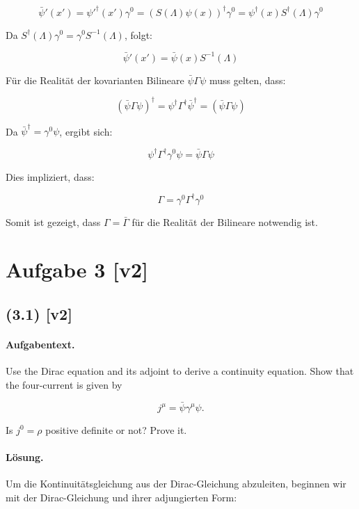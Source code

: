 \documentclass[11pt,a4paper]{article}
\begin{document}
\[
\bar{\psi}'(x') = \psi'^\dagger(x') \gamma^0 = \left(S(\Lambda) \psi(x)\right)^\dagger \gamma^0 = \psi^\dagger(x) S^\dagger(\Lambda) \gamma^0
\]

Da \(S^\dagger(\Lambda) \gamma^0 = \gamma^0 S^{-1}(\Lambda)\), folgt:

\[
\bar{\psi}'(x') = \bar{\psi}(x) S^{-1}(\Lambda)
\]

Für die Realität der kovarianten Bilineare \(\bar{\psi} \Gamma \psi\) muss gelten, dass:

\[
(\bar{\psi} \Gamma \psi)^\dagger = \psi^\dagger \Gamma^\dagger \bar{\psi}^\dagger = (\bar{\psi} \Gamma \psi)
\]

Da \(\bar{\psi}^\dagger = \gamma^0 \psi\), ergibt sich:

\[
\psi^\dagger \Gamma^\dagger \gamma^0 \psi = \bar{\psi} \Gamma \psi
\]

Dies impliziert, dass:

\[
\Gamma = \gamma^0 \Gamma^\dagger \gamma^0
\]

Somit ist gezeigt, dass \(\Gamma = \bar{\Gamma}\) für die Realität der Bilineare notwendig ist.


\section*{Aufgabe 3 [v2]}
\subsection*{(3.1) [v2]}
\paragraph{Aufgabentext.}
Use the Dirac equation and its adjoint to derive a continuity equation. Show that the four-current is given by

$$
j^\mu=\bar{\psi} \gamma^\mu \psi .
$$


Is $j^0=\rho$ positive definite or not? Prove it.

\paragraph{Lösung.}
Um die Kontinuitätsgleichung aus der Dirac-Gleichung abzuleiten, beginnen wir mit der Dirac-Gleichung und ihrer adjungierten Form:
\end{document}
